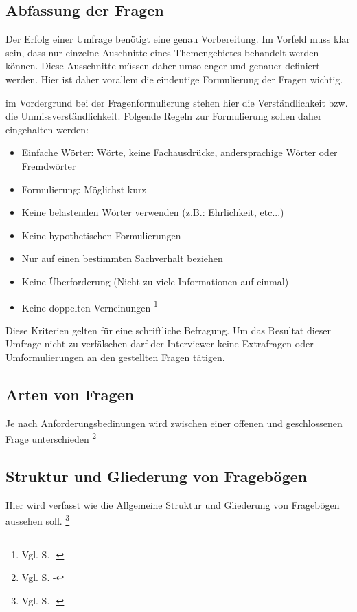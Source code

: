 \subsection{Abfassung der Fragen}
Der Erfolg einer Umfrage benötigt eine genau Vorbereitung. Im Vorfeld muss klar sein,
dass nur einzelne Auschnitte eines Themengebietes behandelt werden können. Diese Ausschnitte
müssen daher umso enger und genauer definiert werden. Hier ist daher vorallem die eindeutige
Formulierung der Fragen wichtig.

im Vordergrund bei der Fragenformulierung stehen hier die Verständlichkeit bzw. die Unmissverständlichkeit.
Folgende Regeln zur Formulierung sollen daher eingehalten werden:
\begin{itemize}
    \item Einfache Wörter: Wörte, keine Fachausdrücke, andersprachige Wörter oder Fremdwörter
    \item Formulierung: Möglichst kurz
    \item Keine belastenden Wörter verwenden (z.B.: Ehrlichkeit, etc...)
    \item Keine hypothetischen Formulierungen
    \item Nur auf einen bestimmten Sachverhalt beziehen
    \item Keine Überforderung (Nicht zu viele Informationen auf einmal)
    \item Keine doppelten Verneinungen \footnote{Vgl. \cite{Mayer} S. -}
\end{itemize}

Diese Kriterien gelten für eine schriftliche Befragung. Um das Resultat dieser Umfrage nicht
zu verfälschen darf der Interviewer keine Extrafragen oder Umformulierungen an den gestellten
Fragen tätigen.

\subsection{Arten von Fragen}
Je nach Anforderungsbedinungen wird zwischen einer offenen und geschlossenen Frage unterschieden \footnote{Vgl. \cite{Mayer} S. -}


\subsection{Struktur und Gliederung von Fragebögen}
Hier wird verfasst wie die Allgemeine Struktur und Gliederung von Fragebögen aussehen soll. \footnote{Vgl. \cite{Buehner} S. -}

